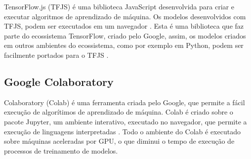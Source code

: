 TensorFlow.js (TFJS) é uma biblioteca JavaScript desenvolvida para criar e executar algoritmos de aprendizado de máquina. Os modelos desenvolvidos com TFJS, podem ser executados em um navegador \cite{tensorflowjs2019}. Esta é uma biblioteca que faz parte do ecossistema TensorFlow, criado pelo Google, assim, os modelos criados em outros ambientes do ecossistema, como por exemplo em Python, podem ser facilmente portados para o TFJS \cite{tensorflowjs2019}.

\subsection{Google Colaboratory}

Colaboratory (Colab) é uma ferramenta criada pelo Google, que permite a fácil execução de algorítimos de aprendizado de máquina. Colab é criado sobre o pacote Jupyter, um ambiente interativo, executado no navegador, que permite a execução de linguagens interpretadas \cite{PER-GRA:2007}. Todo o ambiente do Colab é executado sobre máquinas aceleradas por GPU, o que diminui o tempo de execução de processos de treinamento de modelos.
